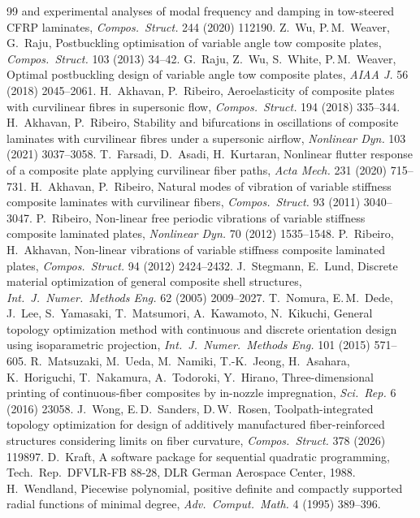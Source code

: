 \begin{thebibliography}{99}
and experimental analyses of modal frequency and damping in tow-steered CFRP laminates,
\emph{Compos.\ Struct.} 244 (2020) 112190.
 Z.\ Wu, P.\,M.\ Weaver, G.\ Raju, Postbuckling optimisation of variable angle tow
composite plates, \emph{Compos.\ Struct.} 103 (2013) 34--42.
 G.\ Raju, Z.\ Wu, S.\ White, P.\,M.\ Weaver, Optimal postbuckling design of
variable angle tow composite plates, \emph{AIAA J.} 56 (2018) 2045--2061.
 H.\ Akhavan, P.\ Ribeiro, Aeroelasticity of composite plates with
curvilinear fibres in supersonic flow, \emph{Compos.\ Struct.} 194 (2018) 335--344.
 H.\ Akhavan, P.\ Ribeiro, Stability and bifurcations in oscillations of
composite laminates with curvilinear fibres under a supersonic airflow, \emph{Nonlinear Dyn.}
103 (2021) 3037--3058.
 T.\ Farsadi, D.\ Asadi, H.\ Kurtaran, Nonlinear flutter response of a
composite plate applying curvilinear fiber paths, \emph{Acta Mech.} 231 (2020) 715--731.
 H.\ Akhavan, P.\ Ribeiro, Natural modes of vibration of variable stiffness
composite laminates with curvilinear fibers, \emph{Compos.\ Struct.} 93 (2011) 3040--3047.
 P.\ Ribeiro, Non-linear free periodic vibrations of variable stiffness
composite laminated plates, \emph{Nonlinear Dyn.} 70 (2012) 1535--1548.
 P.\ Ribeiro, H.\ Akhavan, Non-linear vibrations of variable
stiffness composite laminated plates, \emph{Compos.\ Struct.} 94 (2012) 2424--2432.
 J.\ Stegmann, E.\ Lund, Discrete material optimization of general
composite shell structures, \emph{Int.\ J.\ Numer.\ Methods Eng.} 62 (2005) 2009--2027.
 T.\ Nomura, E.\,M.\ Dede, J.\ Lee, S.\ Yamasaki, T.\ Matsumori, A.\ Kawamoto,
N.\ Kikuchi, General topology optimization method with continuous and discrete orientation
design using isoparametric projection, \emph{Int.\ J.\ Numer.\ Methods Eng.} 101 (2015)
571--605.
 R.\ Matsuzaki, M.\ Ueda, M.\ Namiki, T.-K.\ Jeong, H.\ Asahara, K.\
Horiguchi, T.\ Nakamura, A.\ Todoroki, Y.\ Hirano, Three-dimensional printing of
continuous-fiber composites by in-nozzle impregnation, \emph{Sci.\ Rep.} 6 (2016) 23058.
\bibitem{wong2026} J.\ Wong, E.\,D.\ Sanders, D.\,W.\ Rosen, Toolpath-integrated topology
optimization for design of additively manufactured fiber-reinforced structures considering
limits on fiber curvature, \emph{Compos.\ Struct.} 378 (2026) 119897.
\bibitem{kraft1988} D.\ Kraft, A software package for sequential quadratic programming,
Tech.\ Rep.\ DFVLR-FB 88-28, DLR German Aerospace Center, 1988.
 H.\ Wendland, Piecewise polynomial, positive definite and compactly
supported radial functions of minimal degree, \emph{Adv.\ Comput.\ Math.} 4 (1995) 389--396.
\end{thebibliography}
